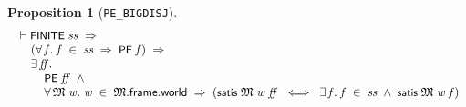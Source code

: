 \documentclass[letterpaper]{article}
\newtheorem{prop}{Proposition}
\renewcommand{\HOLConst}[1]{{\textsf{\upshape\small #1}}}
\newenvironment{holmath}{\begin{displaymath}\begin{array}{l}}{\end{array}\end{displaymath}\ignorespacesafterend}
\begin{document}
\begin{prop}[\texttt{PE_BIGDISJ}]
\begin{holmath}
  \ensuremath{\HOLTokenTurnstile}\HOLConst{FINITE}\;\HOLFreeVar{ss}\;\HOLSymConst{\HOLTokenImp{}}\\
\;\;\;\;\;(\HOLSymConst{\HOLTokenForall{}}\HOLBoundVar{f}.\;\HOLBoundVar{f}\;\HOLSymConst{\HOLTokenIn{}}\;\HOLFreeVar{ss}\;\HOLSymConst{\HOLTokenImp{}}\;\HOLConst{PE}\;\HOLBoundVar{f})\;\HOLSymConst{\HOLTokenImp{}}\\
\;\;\;\;\;\HOLSymConst{\HOLTokenExists{}}\HOLBoundVar{ff}.\\
\;\;\;\;\;\;\;\;\;\HOLConst{PE}\;\HOLBoundVar{ff}\;\HOLSymConst{\HOLTokenConj{}}\\
\;\;\;\;\;\;\;\;\;\HOLSymConst{\HOLTokenForall{}}\HOLBoundVar{\ensuremath{\mathfrak{M}}}\;\HOLBoundVar{w}.\;\HOLBoundVar{w}\;\HOLSymConst{\HOLTokenIn{}}\;\HOLBoundVar{\ensuremath{\mathfrak{M}}}.\HOLFieldName{frame}.\HOLFieldName{world}\;\HOLSymConst{\HOLTokenImp{}}\;(\HOLConst{satis}\;\HOLBoundVar{\ensuremath{\mathfrak{M}}}\;\HOLBoundVar{w}\;\HOLBoundVar{ff}\;\HOLSymConst{\HOLTokenEquiv{}}\;\HOLSymConst{\HOLTokenExists{}}\HOLBoundVar{f}.\;\HOLBoundVar{f}\;\HOLSymConst{\HOLTokenIn{}}\;\HOLFreeVar{ss}\;\HOLSymConst{\HOLTokenConj{}}\;\HOLConst{satis}\;\HOLBoundVar{\ensuremath{\mathfrak{M}}}\;\HOLBoundVar{w}\;\HOLBoundVar{f})
\end{holmath}
\end{prop}
\end{document}
